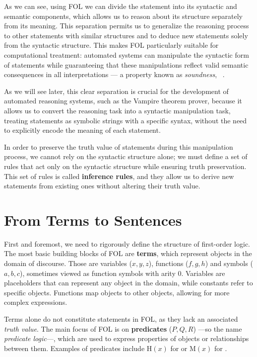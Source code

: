 As we can see, using FOL we can divide the statement into its syntactic and semantic components, which allows us to reason about its structure separately from its meaning.
This separation permits us to generalize the reasoning process to other statements with similar structures and to deduce new statements solely from the syntactic structure.
This makes FOL particularly suitable for computational treatment: automated systems can manipulate the syntactic form of statements while guaranteeing that these manipulations reflect valid semantic consequences in all interpretations — a property known as \textit{soundness}, \citeauthor{enderton2001}~\cite{enderton2001}.

As we will see later, this clear separation is crucial for the development of automated reasoning systems, such as the Vampire theorem prover, because it allows us to convert the reasoning task into a syntactic manipulation task, treating statements as symbolic strings with a specific syntax, without the need to explicitly encode the meaning of each statement.

In order to preserve the truth value of statements during this manipulation process, we cannot rely on the syntactic structure alone; we must define a set of rules that act only on the syntactic structure while ensuring truth preservation.
This set of rules is called \textbf{inference rules}, and they allow us to derive new statements from existing ones without altering their truth value.
\section{From Terms to Sentences}

First and foremost, we need to rigorously define the structure of first-order logic.
The most basic building blocks of FOL are \textbf{terms}, which represent objects in the domain of discourse.
Those are variables (\(x,y,z\)), functions (\(f,g,h\)) and  symbols (\(a,b,c\)), sometimes viewed as function symbols with arity 0.
Variables are placeholders that can represent any object in the domain, while constants refer to specific objects. Functions map objects to other objects, allowing for more complex expressions.

Terms alone do not constitute statements in FOL, as they lack an associated \textit{truth value}.
The main focus of FOL is on \textbf{predicates} (\(P,Q,R\)) ---so the name \textit{predicate logic}---, which are used to express properties of objects or relationships between them.
Examples of predicates include \(\text{H}(x)\) for  or \(\text{M}(x)\) for .


